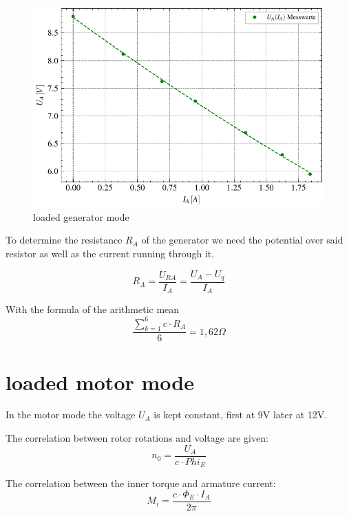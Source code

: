 \documentclass[conference]{IEEEtran}
\begin{document}
\begin{figure}[htbp]
    \centering
    \includegraphics[width=\columnwidth]{plots/4.2_Belasteter_Generator_4000.pdf}
    \caption{loaded generator mode}
    \label{fig:Anlaufmoment}
\end{figure}

To determine the resistance $R_A$ of the generator we need the potential over said resistor as well as the current running through it.

\begin{equation}
    R_A = \frac{U_{RA}}{I_A} = \frac{U_A - U_q}{I_A}
\end{equation}

With the formula of the arithmetic mean
\begin{equation}
    \frac{ \sum\limits_{k = 1}^{6} c \cdot R_A}{6} = 1,62 \Omega
\end{equation}


\section{loaded motor mode}
In the motor mode the voltage $U_A$ is kept constant, first at 9V later at 12V.

The correlation between rotor rotations and voltage are given:
\begin{equation}
    n_0 = \frac{U_A}{c \cdot Phi_E}
\end{equation}

The correlation between the inner torque and armature current:
\begin{equation}
    M_i = \frac{c \cdot \Phi_E \cdot I_A}{2 \pi}
\end{equation}
\end{document}
